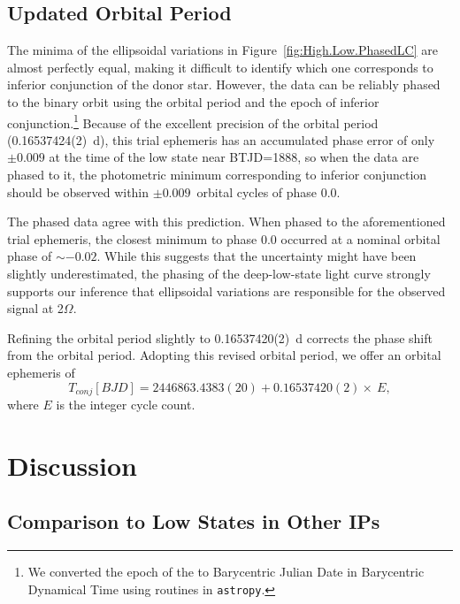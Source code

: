 \documentclass[twocolumn]{aastex63}
\newcommand{\doubleorbit}{2$\Omega$}
\begin{document}
\subsection{Updated Orbital Period}

The minima of the ellipsoidal variations in Figure~\ref{fig:High.Low.PhasedLC} are almost perfectly equal, making it difficult to identify which one corresponds to inferior conjunction of the donor star. However, the data can be reliably phased to the binary orbit using the \citet{joshi_yy_dra} orbital period and the \citet{haswell} epoch of inferior conjunction.\footnote{ We converted the epoch of the \citet{haswell} to Barycentric Julian Date in Barycentric Dynamical Time using routines in {\tt astropy}.} Because of the excellent precision of the \citet{joshi_yy_dra} orbital period (0.16537424(2)~d), this trial ephemeris has an accumulated phase error of only $\pm0.009$ at the time of the low state near BTJD=1888, so when the data are phased to it, the photometric minimum corresponding to inferior conjunction should be observed within $\pm0.009$~orbital cycles of phase 0.0. 

The phased data agree with this prediction. When phased to the aforementioned trial ephemeris, the closest minimum to phase 0.0 occurred at a nominal orbital phase of $\sim-0.02$. While this suggests that the \citet{joshi_yy_dra} uncertainty might have been slightly underestimated, the phasing of the deep-low-state light curve strongly supports our inference that ellipsoidal variations are responsible for the observed signal at \doubleorbit.

Refining the orbital period slightly to 0.16537420(2)~d corrects the phase shift from the \citet{joshi_yy_dra} orbital period. Adopting this revised orbital period, we offer an orbital ephemeris of \begin{equation}
    T_{conj}[BJD] = 2446863.4383(20) + 0.16537420(2)\times\ E,
    \label{ephemeris}
\end{equation}
where $E$ is the integer cycle count.

\section{Discussion}

\subsection{Comparison to Low States in Other IPs} \label{sec:comparison}
\end{document}
